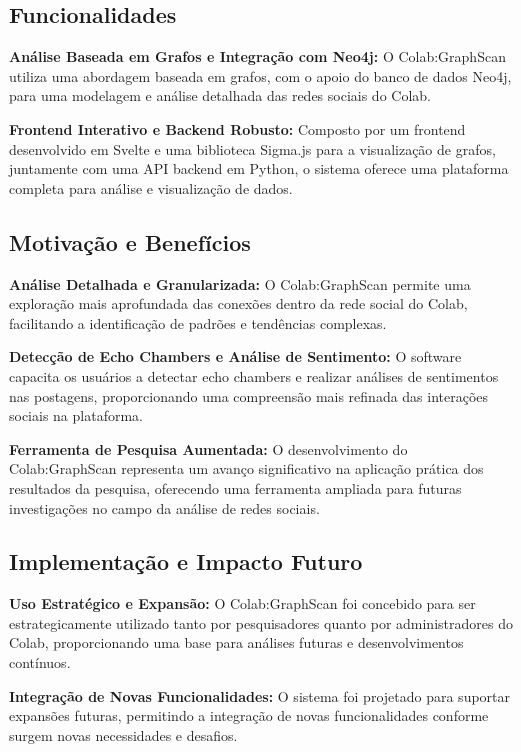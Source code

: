 \subsection*{Funcionalidades}

\textbf{Análise Baseada em Grafos e Integração com Neo4j:} O Colab:GraphScan utiliza uma abordagem baseada em grafos, com o apoio do banco de dados Neo4j, para uma modelagem e análise detalhada das redes sociais do Colab.

\textbf{Frontend Interativo e Backend Robusto:} Composto por um frontend desenvolvido em Svelte e uma biblioteca Sigma.js para a visualização de grafos, juntamente com uma API backend em Python, o sistema oferece uma plataforma completa para análise e visualização de dados.

\subsection*{Motivação e Benefícios}
\textbf{Análise Detalhada e Granularizada:} O Colab:GraphScan permite uma exploração mais aprofundada das conexões dentro da rede social do Colab, facilitando a identificação de padrões e tendências complexas.

\textbf{Detecção de Echo Chambers e Análise de Sentimento:} O software capacita os usuários a detectar echo chambers e realizar análises de sentimentos nas postagens, proporcionando uma compreensão mais refinada das interações sociais na plataforma.

\textbf{Ferramenta de Pesquisa Aumentada:} O desenvolvimento do Colab:GraphScan representa um avanço significativo na aplicação prática dos resultados da pesquisa, oferecendo uma ferramenta ampliada para futuras investigações no campo da análise de redes sociais.

\subsection*{Implementação e Impacto Futuro}

\textbf{Uso Estratégico e Expansão:} O Colab:GraphScan foi concebido para ser estrategicamente utilizado tanto por pesquisadores quanto por administradores do Colab, proporcionando uma base para análises futuras e desenvolvimentos contínuos.

\textbf{Integração de Novas Funcionalidades:} O sistema foi projetado para suportar expansões futuras, permitindo a integração de novas funcionalidades conforme surgem novas necessidades e desafios.

